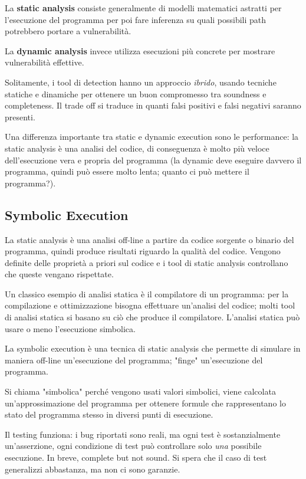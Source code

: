 La \textbf{static analysis} consiste generalmente di modelli matematici astratti per l'esecuzione del programma per poi fare inferenza su quali possibili path potrebbero portare a vulnerabilità.

La \textbf{dynamic analysis} invece utilizza esecuzioni più concrete per mostrare vulnerabilità effettive.

Solitamente, i tool di detection hanno un approccio \textit{ibrido}, usando tecniche statiche e dinamiche per ottenere un buon compromesso tra soundness e completeness. Il trade off si traduce in quanti falsi positivi e falsi negativi saranno presenti.

Una differenza importante tra static e dynamic execution sono le performance: la static analysis è una analisi del codice, di conseguenza è molto più veloce dell'esecuzione vera e propria del programma (la dynamic deve eseguire davvero il programma, quindi può essere molto lenta; quanto ci può mettere il programma?).

\subsection{Symbolic Execution}

La static analysis è una analisi off-line a partire da codice sorgente o binario del programma, quindi produce risultati riguardo la qualità del codice. Vengono definite delle proprietà a priori sul codice e i tool di static analysis controllano che queste vengano rispettate. 

Un classico esempio di analisi statica è il compilatore di un programma: per la compilazione e ottimizzazione bisogna effettuare un'analisi del codice; molti tool di analisi statica si basano su ciò che produce il compilatore. L'analisi statica può usare o meno l'esecuzione simbolica.

La symbolic execution è una tecnica di static analysis che permette di simulare in maniera off-line un'esecuzione del programma; "finge" un'esecuzione del programma. 

Si chiama "simbolica" perché vengono usati valori simbolici, viene calcolata un'approssimazione del programma per ottenere formule che rappresentano lo stato del programma stesso in diversi punti di esecuzione. 

Il testing funziona: i bug riportati sono reali, ma ogni test è sostanzialmente un'asserzione, ogni condizione di test può controllare solo \textit{una} possibile esecuzione. In breve, complete but not sound. Si spera che il caso di test generalizzi abbastanza, ma non ci sono garanzie.

